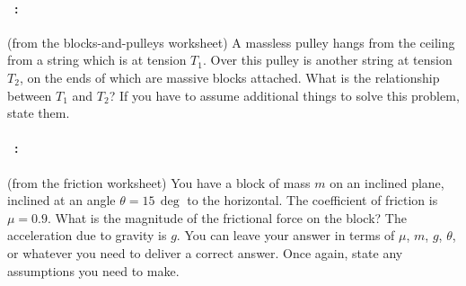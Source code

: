 \documentclass[12pt]{article}
\begin{document}
\paragraph{\problemname~\theproblem:}%
(from the blocks-and-pulleys worksheet)
A massless pulley hangs from the ceiling from a string which is at
tension $T_1$. Over this pulley is another string at tension $T_2$, on
the ends of which are massive blocks attached. What is the
relationship between $T_1$ and $T_2$? If you have to assume additional
things to solve this problem, state them.

\vfill

\paragraph{\problemname~\theproblem:}%
(from the friction worksheet)
You have a block of mass $m$ on an inclined plane, inclined at an
angle $\theta=15\,\deg$ to the horizontal. The coefficient of friction
is $\mu=0.9$. What is the magnitude of the frictional force on the
block? The acceleration due to gravity is $g$.
You can leave your answer in terms of $\mu$, $m$, $g$, $\theta$, or
whatever you need to deliver a correct answer.
Once again, state any assumptions you need to make.

\vfill
~
\end{document}
